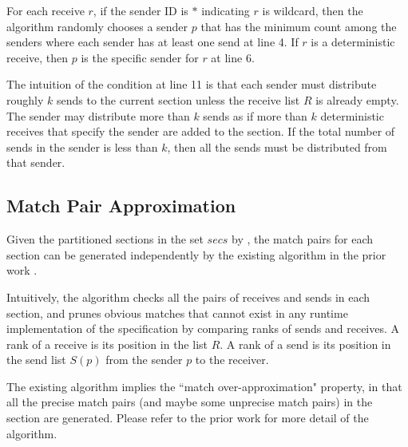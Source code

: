 
For each receive $r$, if the sender ID is $\ast$ indicating $r$ is wildcard, then the algorithm randomly chooses a sender $p$ that has the minimum count among the senders where each sender has at least one send at line 4. If $r$ is a deterministic receive, then $p$ is the specific sender for $r$ at line 6.

The intuition of the condition at line 11 is that each sender must distribute roughly $k$ sends to the current section unless the receive list $R$ is already empty. The sender may distribute more than $k$ sends as if more than $k$ deterministic receives that specify the sender are added to the section. If the total number of sends in the sender is less than $k$, then all the sends must be distributed from that sender.  



 
 \subsection{Match Pair Approximation}

Given the partitioned sections in the set $\mathit{secs}$ by , the match pairs for each section can be generated independently by the existing algorithm in the prior work \cite{DBLP:conf/kbse/HuangMM13}. 

Intuitively, the algorithm checks all the pairs of receives and sends in each section, and prunes obvious matches that cannot exist in any runtime implementation of the specification by comparing ranks of sends and receives. 
A rank of a receive is its position in the list $R$. 
A rank of a send is its position in the send list $S(p)$ from the sender $p$ to the receiver.    

The existing algorithm implies the ``match over-approximation" property, in that all the precise match pairs (and maybe some unprecise match pairs) in the section are generated.
Please refer to the prior work \cite{DBLP:conf/kbse/HuangMM13} for more detail of the algorithm. 

